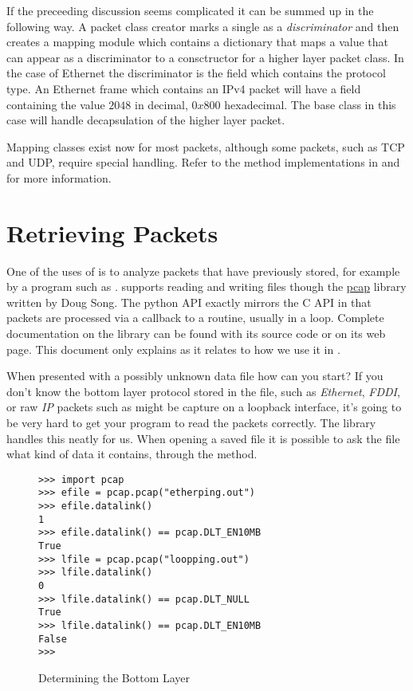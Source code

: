 \documentclass[11pt]{article}
\begin{document}
If the preceeding discussion seems complicated it can be summed up in
the following way.  A packet class creator marks a single
 as a \emph{discriminator} and then creates a mapping
module which contains a dictionary that maps a value that can appear
as a discriminator to a consctructor for a higher layer packet class.
In the case of Ethernet the discriminator is the  field
which contains the protocol type.  An Ethernet frame which contains an
IPv4 packet will have a  field containing the value $2048$
in decimal, $0x800$ hexadecimal.  The  base class in
this case will handle decapsulation of the higher layer packet.

Mapping classes exist now for most packets, although some packets,
such as TCP and UDP, require special handling.  Refer to the
 method implementations in 
and  for more information.

\section{Retrieving Packets}
\label{sec:retrieving-packets}

One of the uses of  is to analyze packets that have
previously stored, for example by a program such as
.   supports reading and writing
 files though the
\href{http://monkey.org/~dugsong/pypcap/}{pcap} library written by
Doug Song.  The python API exactly mirrors the C API in that packets
are processed via a callback to a  routine, usually
in a loop.  Complete documentation on the  library can
be found with its source code or on its web page.  This document only
explains  as it relates to how we use it in
.

When presented with a possibly unknown data file how can you start?
If you don't know the bottom layer protocol stored in the file, such
as \emph{Ethernet}, \emph{FDDI}, or raw \emph{IP} packets such as
might be capture on a loopback interface, it's going to be very hard
to get your program to read the packets correctly.  The 
library handles this neatly for us.  When opening a saved file it is
possible to ask the file what kind of data it contains, through the
 method.

\begin{figure}
  \centering
\begin{lstlisting}
>>> import pcap
>>> efile = pcap.pcap("etherping.out")
>>> efile.datalink()
1
>>> efile.datalink() == pcap.DLT_EN10MB
True
>>> lfile = pcap.pcap("loopping.out")
>>> lfile.datalink()
0
>>> lfile.datalink() == pcap.DLT_NULL
True
>>> lfile.datalink() == pcap.DLT_EN10MB
False
>>> 
\end{lstlisting}
  \caption{Determining the Bottom Layer}
  \label{fig:determining-the-bottom-layer}
\end{figure}
\end{document}

